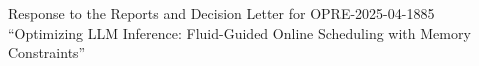 \documentclass[11pt]{article}
\newcommand{\manuscript}{OPRE-2025-04-1885}
\newcommand{\papertitle}{Optimizing LLM Inference: Fluid-Guided Online Scheduling with Memory Constraints}
\begin{document}
\begin{center}
{\Large Response to the Reports and Decision Letter for \manuscript}\\[0.35em]
{\large ``\papertitle''}
\end{center}

\vspace{0.5em}









\end{document}
